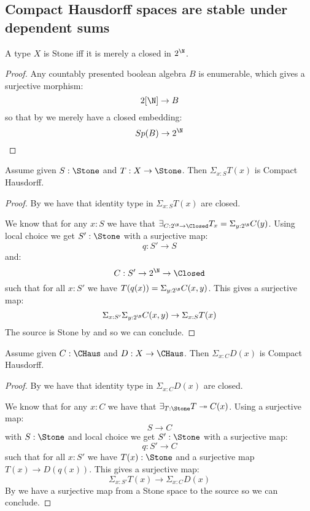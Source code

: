 \subsection{Compact Hausdorff spaces are stable under dependent sums}

\begin{lemma}
A type $X$ is Stone iff it is merely a closed in $2^\N$.
\end{lemma}

\begin{proof}
Any countably presented boolean algebra $B$ is enumerable, which gives a surjective morphism:
$$ 2[\N]\to B$$
so that by  we merely have a closed embedding:
$$ Sp(B)\to 2^\N$$
\end{proof}

\begin{lemma}\label{SigmaStoneCompactHausdorff}
Assume given $S:\Stone$ and $T:X\to \Stone$. Then $\Sigma_{x:S}T(x)$ is Compact Hausdorff.
\end{lemma}

\begin{proof}
By  we have that identity type in $\Sigma_{x:S}T(x)$ are closed.

We know that for any $x:S$ we have that $\exists_{C:2^\N\to \Closed} T_x = \Sigma_{y:2^\N}C(y)$. Using local choice we get $S':\Stone$ with a surjective map:
$$q:S'\to S$$
and:
$$ C : S'\to 2^\N\to\Closed$$
such that for all $x:S'$ we have $T(q(x)) = \Sigma_{y:2^\N}C(x,y)$. This gives a surjective map:
$$ \Sigma_{x:S'}\Sigma_{y:2^\N} C(x,y)\to \Sigma_{x:S}T(x)$$
The source is Stone by  and  so we can conclude.
\end{proof}

\begin{lemma}
Assume given $C:\CHaus$ and $D:X\to \CHaus$. Then $\Sigma_{x:C}D(x)$ is Compact Hausdorff.
\end{lemma}

\begin{proof}
By  we have that identity type in $\Sigma_{x:C}D(x)$ are closed.

We know that for any $x:C$ we have that $\exists_{T:\Stone} T\twoheadrightarrow C(x)$. Using a surjective map:
$$ S\to C$$
with $S:\Stone$ and local choice we get $S':\Stone$ with a surjective map:
$$q:S'\to C$$
such that for all $x:S'$ we have $T(x):\Stone$ and a surjective map $T(x)\to D(q(x))$. This gives a surjective map:
$$ \Sigma_{x:S'}T(x)\to \Sigma_{x:C}D(x)$$
By  we have a surjective map from a Stone space to the source so we can conclude.
\end{proof}